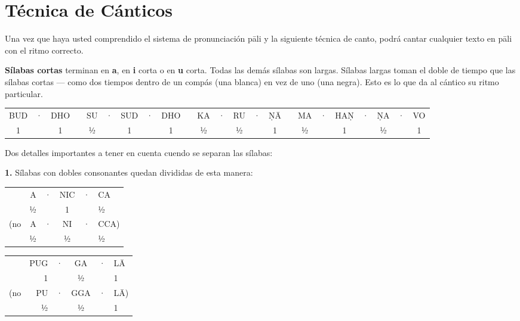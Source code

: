 \section{Técnica de Cánticos}

Una vez que haya usted comprendido el sistema de pronunciación pāli y la siguiente técnica de canto, podrá cantar cualquier texto en pāli con el ritmo correcto.

\textbf{Sílabas cortas} terminan en \textbf{a}, en \textbf{i} corta o en
\textbf{u} corta. Todas las demás sílabas son largas.
Sílabas largas toman el doble de tiempo que las sílabas cortas --- como dos tiempos dentro de un compás (una blanca) en vez de uno (una negra). Esto es lo que da al cántico su ritmo particular.

\begin{centering}
	
	{\setlength{\tabcolsep}{1.8pt}%
		\begin{tabular}{ccc c ccccc c ccccc c ccccccc}
			BUD & · & DHO & \hsp & SU & · & SUD & · & DHO & \hsp & KA & · & RU & · & ṆĀ & \hsp & MA & · & HAṆ & · & ṆA & · & VO\\
			1  &   & 1   &      & ½  &   & 1   &   & 1   &      & ½  &   & ½  &   & 1  &      & ½  &   & 1   &   & ½  &   & 1\\
		\end{tabular}%
	}
	
\end{centering}

Dos detalles importantes a tener en cuenta cuendo se separan las sílabas:

\textbf{1.} Sílabas con dobles consonantes quedan divididas de esta manera:

\begin{centering}
	
	\begin{minipage}{0.8\linewidth}
		\begin{multicols}{2}
			\setlength{\tabcolsep}{1.8pt}%
			
			\begin{tabular}{rrcccl}
				& A & · & NIC & · & CA   \\
				& ½ &   &  1  &   & ½    \\
				(no & A & · & NI  & · & CCA) \\
				& ½ &   & ½   &   & ½    \\
			\end{tabular}
			
			\columnbreak
			
			\begin{tabular}{rrcccl}
				& PUG & · & GA  & · & LĀ \\
				&  1  &   &  ½  &   &  1 \\
				(no & PU  & · & GGA & · & LĀ)\\
				&  ½  &   &  ½  &   &  1 \\
			\end{tabular}
			
		\end{multicols}
	\end{minipage}
	
\end{centering}

